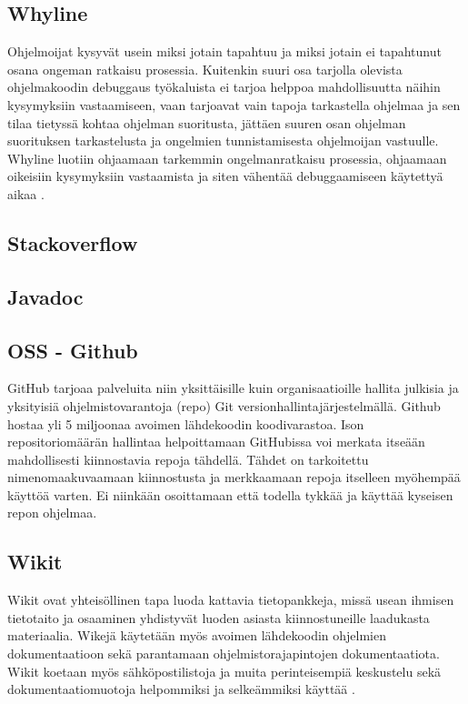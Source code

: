 \documentclass[finnish]{../tktltiki2}
\theoremstyle{definition}
\theoremstyle{remark}
\begin{document}
\subsection{Whyline}
Ohjelmoijat kysyvät usein miksi jotain tapahtuu ja miksi jotain ei tapahtunut osana ongeman ratkaisu prosessia. Kuitenkin suuri osa tarjolla olevista ohjelmakoodin debuggaus työkaluista ei tarjoa helppoa mahdollisuutta näihin kysymyksiin vastaamiseen, vaan tarjoavat vain tapoja tarkastella ohjelmaa ja sen tilaa tietyssä kohtaa ohjelman suoritusta, jättäen suuren osan ohjelman suorituksen tarkastelusta ja ongelmien tunnistamisesta ohjelmoijan vastuulle. Whyline luotiin ohjaamaan tarkemmin ongelmanratkaisu prosessia, ohjaamaan oikeisiin kysymyksiin vastaamista ja siten vähentää debuggaamiseen käytettyä aikaa \cite{whyline}.
\subsection{Stackoverflow}
\subsection{Javadoc}
\subsection{OSS - Github}
GitHub tarjoaa palveluita niin yksittäisille kuin organisaatioille hallita julkisia ja yksityisiä ohjelmistovarantoja (repo) Git versionhallintajärjestelmällä. Github hostaa yli 5 miljoonaa avoimen lähdekoodin koodivarastoa. Ison repositoriomäärän hallintaa helpoittamaan GitHubissa voi merkata itseään mahdollisesti kiinnostavia repoja tähdellä. Tähdet on tarkoitettu nimenomaakuvaamaan kiinnostusta ja merkkaamaan repoja itselleen myöhempää käyttöä varten. Ei niinkään osoittamaan että todella tykkää ja käyttää kyseisen repon ohjelmaa.
\cite{social-networking-meets-se}
\subsection{Wikit}
Wikit ovat yhteisöllinen tapa luoda kattavia tietopankkeja, missä usean ihmisen tietotaito ja osaaminen yhdistyvät luoden asiasta kiinnostuneille laadukasta materiaalia. Wikejä käytetään myös avoimen lähdekoodin ohjelmien dokumentaatioon sekä parantamaan ohjelmistorajapintojen dokumentaatiota. Wikit koetaan myös sähköpostilistoja ja muita perinteisempiä keskustelu sekä dokumentaatiomuotoja helpommiksi ja selkeämmiksi käyttää \cite{using-wikis-in-sw}.
\end{document}
